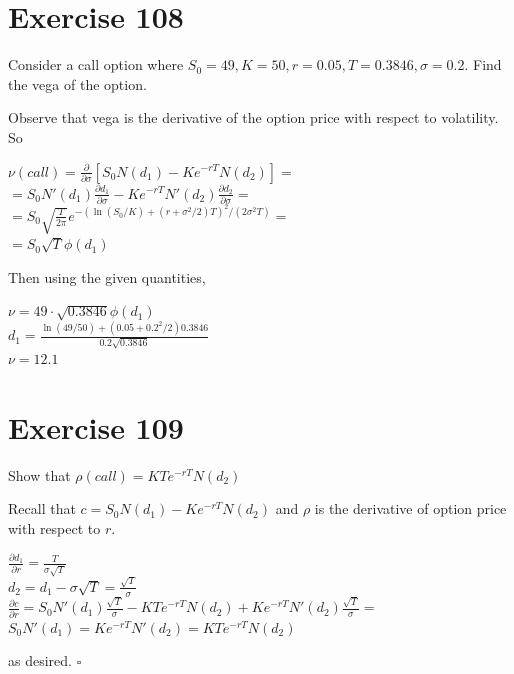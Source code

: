 \documentclass{article}
\begin{document}
\section*{Exercise 108}
Consider a call option where $S_0 = 49, K=50, r = 0.05, T = 0.3846, \sigma = 0.2$. Find the vega of the option.
\begin{flushleft}
    Observe that vega is the derivative of the option price with respect to volatility. So
    \begin{center}
        $\nu (call) = \frac{\partial}{\partial \sigma}[S_0N(d_1) - Ke^{-rT}N(d_2)] = $ \\
        $= S_0N'(d_1)\frac{\partial d_1}{\partial \sigma} - Ke^{-rT}N'(d_2) \frac{\partial d_2}{\partial \sigma} = $ \\
        $= S_0 \sqrt{\frac{T}{2\pi}} e^{-(\ln(S_0/K) + (r + \sigma^2/2)T)^2/(2\sigma^2T)} = $ \\
        $= S_0 \sqrt{T} \phi(d_1)$
    \end{center}
    Then using the given quantities,
    \begin{center}
        $\nu = 49 \cdot \sqrt{0.3846} \phi(d_1)$ \\
        $d_1 = \frac{\ln(49/50) + (0.05 + 0.2^2/2)0.3846}{0.2 \sqrt{0.3846}}$ \\
        $\nu = 12.1$
    \end{center}
\end{flushleft}

\section*{Exercise 109}
Show that $\rho(call) = KTe^{-rT}N(d_2)$
\begin{flushleft}
    Recall that $c = S_0N(d_1) - Ke^{-rT}N(d_2)$ and $\rho$ is the derivative of option price with respect to $r$.
    \begin{center}
        $\frac{\partial d_1}{\partial r} = \frac{T}{\sigma \sqrt{T}}$ \\
        $d_2 = d_1 - \sigma \sqrt{T} = \frac{\sqrt{T}}{\sigma}$ \\
        $\frac{\partial c}{\partial r} = S_0N'(d_1)\frac{\sqrt{T}}{\sigma} - KTe^{-rT}N(d_2) + Ke^{-rT}N'(d_2)\frac{\sqrt{T}}{\sigma} = $ \\
        $S_0N'(d_1) = Ke^{-rT}N'(d_2) = KTe^{-rT}N(d_2)$
    \end{center}
    as desired. $\square$
\end{flushleft}
\end{document}
